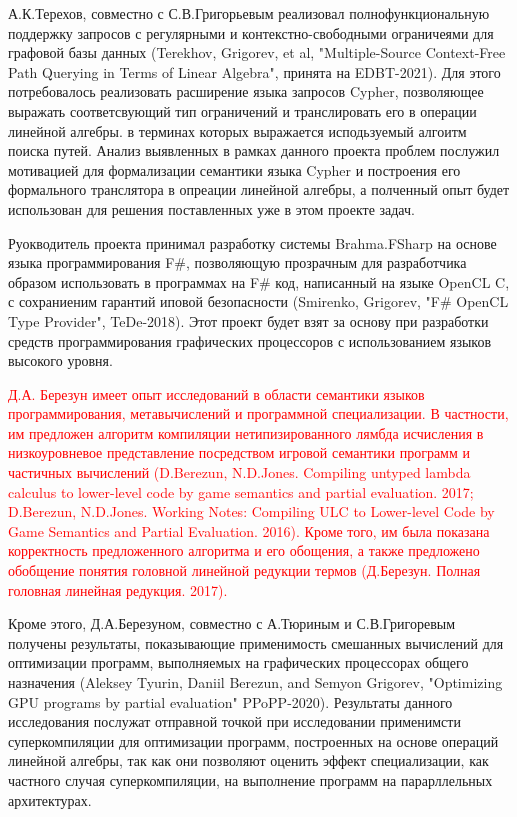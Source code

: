 \documentclass[12pt]{article}  %
\theoremstyle{remark}
\newcommand{\checkme}[1]{\textcolor{red}{#1}}
\begin{document}
А.К.Терехов, совместно с С.В.Григорьевым реализовал полнофункциональную поддержку запросов с регулярными и контекстно-свободными ограничеями для графовой базы данных (Terekhov, Grigorev, et al, "Multiple-Source Context-Free Path Querying in Terms of Linear Algebra", принята на EDBT-2021). Для этого потребовалось реализовать расширение языка запросов Cypher, позволяющее выражать соответсвующий тип ограничений и транслировать его в операции линейной алгебры. в терминах которых выражается исподьзуемый алгоитм поиска путей. Анализ выявленных в рамках данного проекта проблем послужил мотивацией для формализации семантики языка Cypher и построения его формального транслятора в опреации линейной алгебры, а полченный опыт будет использован для решения поставленных уже в этом проекте задач. 

Руокводитель проекта принимал разработку системы Brahma.FSharp на основе языка программирования F\#, позволяющую прозрачным для разработчика образом использовать в программах на F\# код, написанный на языке OpenCL C, с сохраниеним гарантий иповой безопасности (Smirenko, Grigorev, "F\# OpenCL Type Provider", TeDe-2018). Этот проект будет взят за основу при разработки средств программирования графических процессоров с использованием языков высокого уровня. 

\checkme{Д.А. Березун имеет опыт исследований в области семантики языков программирования, метавычислений и
программной специализации. В частности, им предложен алгоритм компиляции нетипизированного лямбда исчисления в низкоуровневое представление посредством игровой семантики программ и частичных вычислений (D.Berezun, N.D.Jones. Compiling untyped lambda calculus to lower-level code by game semantics and partial evaluation. 2017; D.Berezun, N.D.Jones. Working Notes: Compiling ULC to Lower-level Code by Game Semantics and Partial Evaluation. 2016). Кроме того, им была показана корректность предложенного алгоритма и его обощения, а также предложено обобщение понятия головной линейной редукции термов (Д.Березун. Полная головная линейная редукция. 2017).}

Кроме этого, Д.А.Березуном, совместно с А.Тюриным и С.В.Григоревым получены результаты, показывающие применимость смешанных вычислений для оптимизации программ, выполняемых на графических процессорах общего назначения (Aleksey Tyurin, Daniil Berezun, and Semyon Grigorev, "Optimizing GPU programs by partial evaluation" PPoPP-2020). Результаты данного исследования послужат отправной точкой при исследовании применимсти суперкомпиляции для оптимизации программ, построенных на основе операций линейной алгебры, так как они позволяют оценить эффект специализации, как частного случая суперкомпиляции, на выполнение программ на парарллельных архитектурах.
\end{document}

